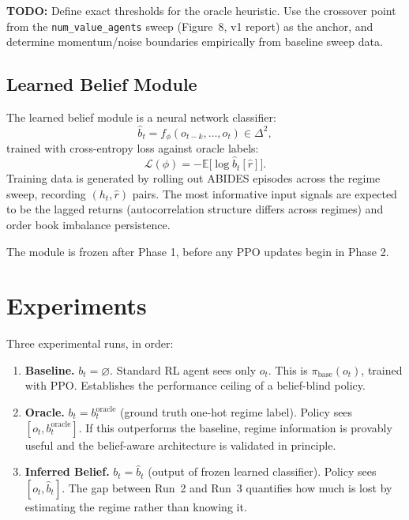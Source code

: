 \documentclass[11pt]{article}
\begin{document}
\noindent\textbf{TODO:} Define exact thresholds for the oracle heuristic. Use the crossover point
from the \texttt{num\_value\_agents} sweep (Figure~8, v1 report) as the anchor, and determine
momentum/noise boundaries empirically from baseline sweep data.

\subsection{Learned Belief Module}

The learned belief module is a neural network classifier:
\[
\hat{b}_t = f_\phi(o_{t-k}, \ldots, o_t) \in \Delta^2,
\]
trained with cross-entropy loss against oracle labels:
\[
\mathcal{L}(\phi) = -\mathbb{E}\bigl[\log \hat{b}_t[\hat{r}]\bigr].
\]
Training data is generated by rolling out ABIDES episodes across the regime sweep, recording
$(h_t, \hat{r})$ pairs. The most informative input signals are expected to be the lagged returns
(autocorrelation structure differs across regimes) and order book imbalance persistence.

The module is frozen after Phase 1, before any PPO updates begin in Phase 2.

\section{Experiments}

Three experimental runs, in order:

\begin{enumerate}[label=\textbf{Run \arabic*.}]

\item \textbf{Baseline.} $b_t = \varnothing$. Standard RL agent sees only $o_t$. This is
$\pi_{\text{base}}(o_t)$, trained with PPO. Establishes the performance ceiling of a
belief-blind policy.

\item \textbf{Oracle.} $b_t = b_t^{\text{oracle}}$ (ground truth one-hot regime label). Policy
sees $[o_t, b_t^{\text{oracle}}]$. If this outperforms the baseline, regime information is
provably useful and the belief-aware architecture is validated in principle.

\item \textbf{Inferred Belief.} $b_t = \hat{b}_t$ (output of frozen learned classifier). Policy
sees $[o_t, \hat{b}_t]$. The gap between Run~2 and Run~3 quantifies how much is lost by
estimating the regime rather than knowing it.

\end{enumerate}
\end{document}
